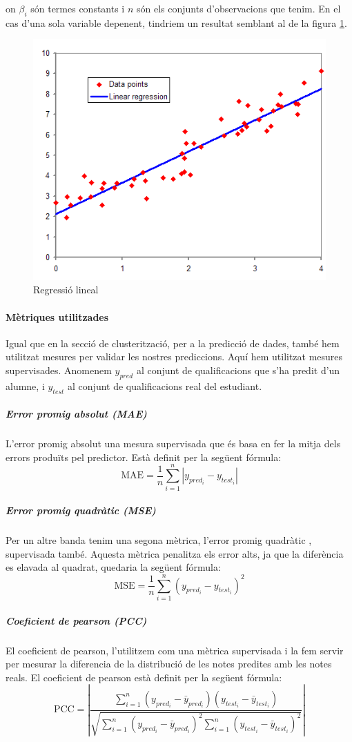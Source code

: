 \documentclass[12pt,a4paper,catalan]{article}
\begin{document}
on $\beta_i$ són termes constants i $n$ són els conjunts d'observacions que tenim. En el cas d'una sola variable depenent, tindriem un resultat semblant al de la figura \ref{fig:linearregressor}.

\begin{figure}[h]
\centering
\includegraphics[width=.5\linewidth]{img/linearregression.png}
\caption{Regressió lineal \cite{imglinearregressor}}
\label{fig:linearregressor}
\end{figure}

\paragraph{Mètriques utilitzades}
\label{par:metriquespredictors}
Igual que en la secció de clusterització, per a la predicció de dades, també hem utilitzat mesures per validar les nostres prediccions. Aquí hem utilitzat mesures supervisades. Anomenem $y_{pred}$ al conjunt de qualificacions que s'ha predit d'un alumne, i $y_{test}$ al conjunt de qualificacions real del estudiant.

\subparagraph{Error promig absolut (MAE)}
L'error promig absolut \cite{mae} una mesura supervisada que és basa en fer la mitja dels errors produïts pel predictor. Està definit per la següent fórmula:
$$ \mathrm{MAE} = \frac{1}{n}\sum_{i=1}^n \left| y_{pred_i}-y_{test_i}\right| $$

\subparagraph{Error promig quadràtic (MSE)}
Per un altre banda tenim una segona mètrica, l'error promig quadràtic \cite{mse}, supervisada també. Aquesta mètrica penalitza els error alts, ja que la diferència es elavada al quadrat, quedaria la següent fórmula:
$$\mathrm{MSE}=\frac{1}{n}\sum_{i=1}^n(y_{pred_i}-y_{test_i})^2$$

\subparagraph{Coeficient de pearson (PCC)}
El coeficient de pearson, l'utilitzem com una mètrica supervisada i la fem servir per mesurar la diferencia de la distribució de les notes predites amb les notes reals. El coeficient de pearson està definit per la següent fórmula:
$$\mathrm{PCC} =\left| \frac{\sum_{i=1}^n(y_{pred_i} - \bar{y}_{pred_i})(y_{test_i} - \bar{y}_{test_i})}{\sqrt{\sum_{i=1}^n(y_{pred_i} - \bar{y}_{pred_i})^2  \sum_{i=1}^n(y_{test_i} - \bar{y}_{test_i})^2}}\right|$$
\end{document}
